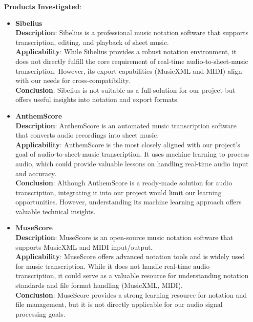 \documentclass[12pt]{article}
\begin{document}
\textbf{Products Investigated}:
\begin{itemize}
    \item \textbf{Sibelius}~\cite{sibelius}\\
    \textbf{Description}: Sibelius is a professional music notation software that supports transcription, editing, and playback of sheet music.\\
    \textbf{Applicability}: While Sibelius provides a robust notation environment, it does not directly fulfill the core requirement of real-time audio-to-sheet-music transcription. However, its export capabilities (MusicXML and MIDI) align with our needs for cross-compatibility.\\
    \textbf{Conclusion}: Sibelius is not suitable as a full solution for our project but offers useful insights into notation and export formats.
    
    \item \textbf{AnthemScore}\cite{AnthemScore}\\
    \textbf{Description}: AnthemScore is an automated music transcription software that converts audio recordings into sheet music.\\
    \textbf{Applicability}: AnthemScore is the most closely aligned with our project’s goal of audio-to-sheet-music transcription. It uses machine learning to process audio, which could provide valuable lessons on handling real-time audio input and accuracy.\\
    \textbf{Conclusion}: Although AnthemScore is a ready-made solution for audio transcription, integrating it into our project would limit our learning opportunities. However, understanding its machine learning approach offers valuable technical insights.
    
    \item \textbf{MuseScore}\cite{MuseScore}\\
    \textbf{Description}: MuseScore is an open-source music notation software that supports MusicXML and MIDI input/output.\\
    \textbf{Applicability}: MuseScore offers advanced notation tools and is widely used for music transcription. While it does not handle real-time audio transcription, it could serve as a valuable resource for understanding notation standards and file format handling (MusicXML, MIDI).\\
    \textbf{Conclusion}: MuseScore provides a strong learning resource for notation and file management, but it is not directly applicable for our audio signal processing goals.
    

\end{itemize}
\end{document}
